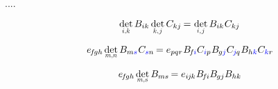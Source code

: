 ....


\nopagebreak\vspace{-0.2em}
\begin{equation}\label{determinantofmatrixproduct}
\determinantby{i}{k} \, \somematrixelements{ik} \hspace{.4ex} \determinantby{k}{\hspace{.15ex}j} \, C_{kj} \hspace{-0.15ex}
= \hspace{.1ex} \determinantby{i}{\hspace{.15ex}j} \, \somematrixelements{ik} \hspace{.1ex} C_{kj}
\end{equation}

\[
e_{\hspace{-0.25ex}f\hspace{-0.2ex}gh} \hspace{.33ex} \determinantby{m}{n} \, \somematrixelements{m\mathcolor{blue}{s}} \hspace{.1ex} C_{\mathcolor{blue}{s}n} \hspace{-0.2ex}
= e_{pqr} \hspace{.1ex} \somematrixelements{\hspace{-0.25ex}f\hspace{-0.1ex}\mathcolor{blue}{i}} C_{\mathcolor{blue}{i}p} \hspace{.1ex} \somematrixelements{\hspace{-0.1ex}g\mathcolor{blue}{j}} C_{\hspace{-0.1ex}\mathcolor{blue}{j}\hspace{-0.1ex}q} \hspace{.1ex} \somematrixelements{h\mathcolor{blue}{k}} C_{\mathcolor{blue}{k}r}
\hspace{-0.2ex}
\]

\[
e_{\hspace{-0.25ex}f\hspace{-0.2ex}gh} \hspace{.33ex} \determinantby{m}{s} \, \somematrixelements{ms} \hspace{-0.2ex}
= e_{i\hspace{-0.1ex}j\hspace{-0.1ex}k} \hspace{.1ex} \somematrixelements{\hspace{-0.25ex}f\hspace{-0.1ex}i} \somematrixelements{\hspace{-0.1ex}gj} \somematrixelements{hk}
\hspace{-0.2ex}
\]

